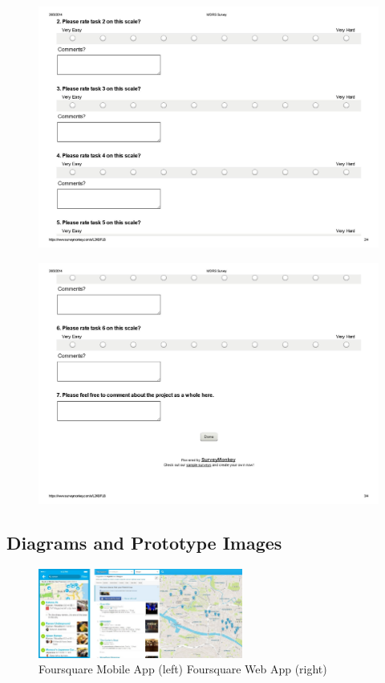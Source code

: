 \documentclass{l3proj}
\begin{document}
\newpage
\begin{figure}[ht!]
\centering
\includegraphics[angle=270, width=1\textwidth]{images/mdrs_survey-page-002.jpg}
\end{figure}

\newpage
\begin{figure}[ht!]
\centering
\includegraphics[angle=270, width=1\textwidth]{images/mdrs_survey-page-003.jpg}
\end{figure}

\newpage
\subsection{Diagrams and Prototype Images}

\begin{figure}[ht!]
\centering
\includegraphics[angle=270, width=0.6\textwidth]{images/foursquare.jpg}
\caption{Foursquare Mobile App (left) Foursquare Web App (right)}
\end{figure}
\end{document}
